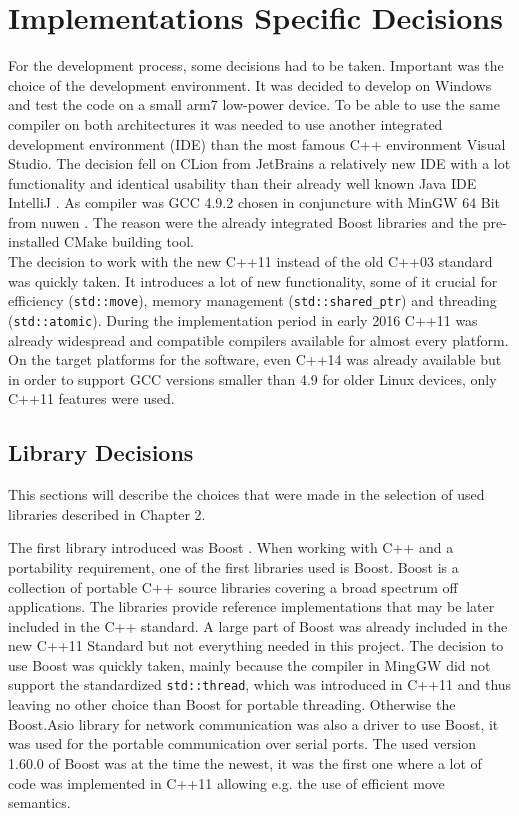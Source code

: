 \section{Implementations Specific Decisions}
For the development process, some decisions had to be taken. Important was the choice of the development environment. It was decided to develop on Windows and test the code on a small arm7 low-power device. To be able to use the same compiler on both architectures it was needed to use another integrated development environment (IDE) than the most famous C++ environment Visual Studio. The decision fell on CLion from JetBrains \cite{clion} a relatively new IDE with a lot functionality and identical usability than their already well known Java IDE IntelliJ \cite{intellij}. As compiler was GCC 4.9.2 chosen in conjuncture with MinGW 64 Bit from nuwen \cite{mingw}. The reason were the already integrated Boost libraries and the pre-installed CMake building tool.\\
The decision to work with the new C++11 \cite{cpp_11} instead of the old C++03 \cite{cpp_03} standard was quickly taken. It introduces a lot of new functionality, some of it crucial for efficiency (\texttt{std::move}), memory management (\texttt{std::shared\_ptr}) and threading (\texttt{std::atomic}). During the implementation period in early 2016 C++11 was already widespread and compatible compilers available for almost every platform. On the target platforms for the software, even C++14 \cite{cpp_14} was already available but in order to support GCC versions smaller than 4.9 for older Linux devices, only C++11 features were used.
\subsection{Library Decisions}
This sections will describe the choices that were made in the selection of used libraries described in Chapter 2.

The first library introduced was Boost \cite{boost}. When working with C++ and a portability requirement, one of the first libraries used is Boost. Boost is a collection of portable C++ source libraries covering a broad spectrum off applications. The libraries provide reference implementations that may be later included in the C++ standard. A large part of Boost was already included in the new C++11 Standard \cite{cpp_11} but not everything needed in this project. The decision to use Boost was quickly taken, mainly because the compiler in MingGW \cite{mingw} did not support the standardized \texttt{std::thread}, which was introduced in C++11 and thus leaving no other choice than Boost for portable threading. Otherwise the Boost.Asio library \cite{boost_asio} for network communication was also a driver to use Boost, it was used for the portable communication over serial ports. The used version 1.60.0 of Boost was at the time the newest, it was the first one where a lot of code was implemented in C++11 allowing e.g. the use of efficient move semantics.

